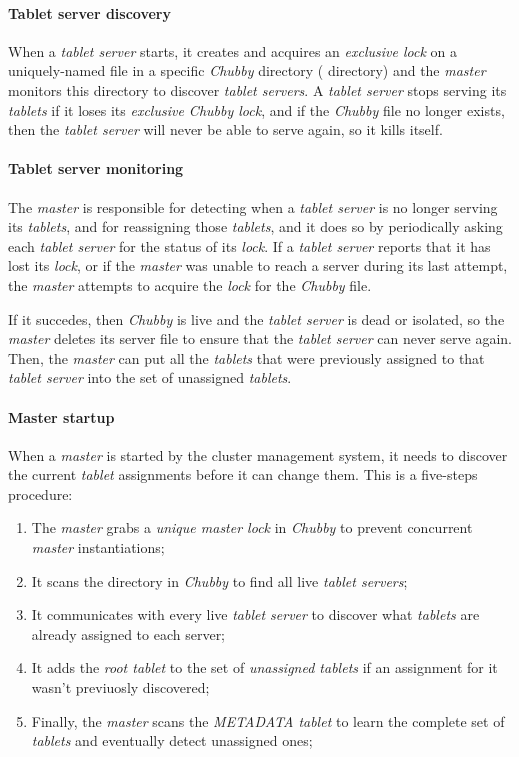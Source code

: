 \paragraph{Tablet server discovery}
When a \emph{tablet server} starts, it creates and acquires an
\emph{exclusive lock} on a uniquely-named file in a specific \emph{Chubby}
directory ( directory) and the \emph{master} monitors this directory
to discover \emph{tablet servers}. A \emph{tablet server} stops serving its
\emph{tablets} if it loses its \emph{exclusive Chubby lock}, and if the
\emph{Chubby} file no longer exists, then the \emph{tablet server} will never
be able to serve again, so it kills itself.

\paragraph{Tablet server monitoring}
The \emph{master} is responsible for detecting when a \emph{tablet server} is no
longer serving its \emph{tablets}, and for reassigning those \emph{tablets},
and it does so by periodically asking each \emph{tablet server} for the status of
its \emph{lock}. If a \emph{tablet server} reports that it has lost its
\emph{lock}, or if the \emph{master} was unable to reach a server during its last
attempt, the \emph{master} attempts to acquire the \emph{lock} for the
\emph{Chubby} file.

If it succedes, then \emph{Chubby} is live and the \emph{tablet server} is dead
or isolated, so the \emph{master} deletes its server file to ensure that the
\emph{tablet server} can never serve again. Then, the \emph{master} can put
all the \emph{tablets} that were previously assigned to that \emph{tablet
server} into the set of unassigned \emph{tablets}.

\paragraph{Master startup}
When a \emph{master} is started by the cluster management system, it needs to
discover the current \emph{tablet} assignments before it can change them. This
is a five-steps procedure:
\begin{enumerate}
    \item The \emph{master} grabs a \emph{unique master lock} in \emph{Chubby}
    to prevent concurrent \emph{master} instantiations;
    \item It scans the  directory in \emph{Chubby} to find all live
    \emph{tablet servers};
    \item It communicates with every live \emph{tablet server} to discover what
    \emph{tablets} are already assigned to each server;
    \item It adds the \emph{root tablet} to the set of \emph{unassigned tablets}
    if an assignment for it wasn't previuosly discovered;
    \item Finally, the \emph{master} scans the \emph{METADATA tablet} to learn
    the complete set of \emph{tablets} and eventually detect unassigned ones;
\end{enumerate}

